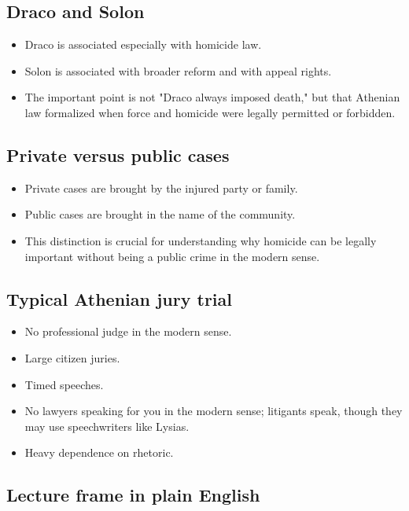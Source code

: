 \documentclass[11pt]{article}
\begin{document}
\subsection{Draco and Solon}

\begin{itemize}
\item Draco is associated especially with homicide law.
\item Solon is associated with broader reform and with appeal rights.
\item The important point is not "Draco always imposed death," but that Athenian law formalized when force and homicide were legally permitted or forbidden.
\end{itemize}

\subsection{Private versus public cases}

\begin{itemize}
\item Private cases are brought by the injured party or family.
\item Public cases are brought in the name of the community.
\item This distinction is crucial for understanding why homicide can be legally important without being a public crime in the modern sense.
\end{itemize}

\subsection{Typical Athenian jury trial}

\begin{itemize}
\item No professional judge in the modern sense.
\item Large citizen juries.
\item Timed speeches.
\item No lawyers speaking for you in the modern sense; litigants speak, though they may use speechwriters like Lysias.
\item Heavy dependence on rhetoric.
\end{itemize}

\subsection{Lecture frame in plain English}
\end{document}
